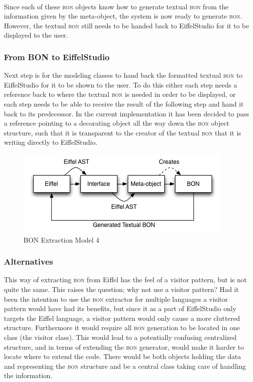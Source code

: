 \paragraph{}
Since each of these \textsc{bon} objects know how to generate textual \textsc{bon} from the information given by the meta-object, the system is now ready to generate \textsc{bon}. However, the textual \textsc{bon} still needs to be handed back to EiffelStudio for it to be displayed to the user.

\subsubsection{From BON to EiffelStudio}
Next step is for the modeling classes to hand back the formatted textual \textsc{bon} to EiffelStudio for it to be shown to the user. To do this either each step needs a reference back to where the textual \textsc{bon} is needed in order to be displayed, or each step needs to be able to receive the result of the following step and hand it back to its predecessor. In the current implementation it has been decided to pass a reference pointing to a decorating object all the way down the \textsc{bon} object structure, such that it is transparent to the creator of the textual \textsc{bon} that it is writing directly to EiffelStudio.

\begin{figure}[H]
\centering
\includegraphics[scale=0.8]{images/BON-extraction-model-4.png}
\caption{BON Extraction Model 4}
\label{fig:bon_extraction_4}
\end{figure}

\subsubsection{Alternatives}
This way of extracting \textsc{bon} from Eiffel has the feel of a visitor pattern, but is not quite the same. This raises the question; why not use a visitor pattern? Had it been the intention to use the \textsc{bon} extractor for multiple languages a visitor pattern would have had its benefits, but since it as a part of EiffelStudio only targets the Eiffel language, a visitor pattern would only cause a more cluttered structure. Furthermore it would require all \textsc{bon} generation to be located in one class (the visitor class). This would lead to a potentially confusing centralized structure, and in terms of extending the \textsc{bon} generator, would make it harder to locate where to extend the code. There would be both objects holding the data and representing the \textsc{bon} structure and be a central class taking care of handling the information.
